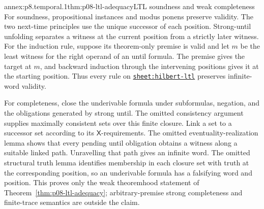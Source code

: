 
\begin{annexitem}{annex:p8.temporal.1}{thm:p08-ltl-adequacy}{LTL soundness and weak completeness}
For soundness, propositional instances and modus ponens preserve validity.
The two next-time principles use the unique successor of each position.
Strong-until unfolding separates a witness at the current position from a
strictly later witness.  For the induction rule, suppose its theorem-only
premise is valid and let \(m\) be the least witness for the right operand of an
until formula.  The premise gives the target at \(m\), and backward induction
through the intervening positions gives it at the starting position.  Thus
every rule on \hyperref[sheet:hilbert-ltl]{\texttt{sheet:hilbert-ltl}}
preserves infinite-word validity.

For completeness, close the underivable formula under subformulas, negation,
and the obligations generated by strong until.  The omitted consistency
argument supplies maximally consistent sets over this finite closure.  Link a
set to a successor set according to its \(\mathsf X\)-requirements.  The omitted
eventuality-realization lemma shows that every pending until obligation obtains
a witness along a suitable linked path.  Unravelling that path gives an
infinite word.  The omitted structural truth lemma identifies membership in
each closure set with truth at the corresponding position, so an underivable
formula has a falsifying word and position.  This proves only the weak
theoremhood statement of Theorem~\ref{thm:p08-ltl-adequacy}; arbitrary-premise
strong completeness and finite-trace semantics are outside the claim.
\end{annexitem}

